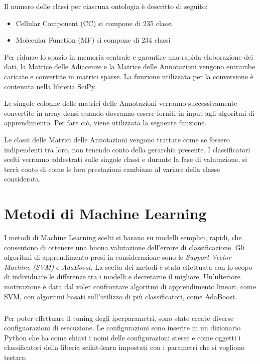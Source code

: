 \documentclass[12pt,a4paper,oneside,hidelinks]{report}
\begin{document}
Il numero delle classi per ciascuna ontologia è descritto di seguito:

\begin{itemize}
    \item Cellular Component (CC) si compone di 235 classi
    \item Molecular Function (MF) si compone di 234 classi
\end{itemize}
  
Per ridurre lo spazio in memoria centrale e garantire una rapida elaborazione dei dati, la Matrice delle Adiacenze e la Matrice delle Annotazioni vengono entrambe caricate e convertite in matrici sparse. La funzione utilizzata per la conversione è contenuta nella libreria SciPy.

Le singole colonne delle matrici delle Annotazioni verranno successivamente convertite in array densi quando dovranno essere forniti in input agli algoritmi di apprendimento. Per fare ciò, viene utilizzata la seguente funzione.

Le classi delle Matrici delle Annotazioni vengono trattate come se fossero indipendenti tra loro, non tenendo conto della gerarchia presente. I classificatori scelti verranno addestrati sulle singole classi e durante la fase di valutazione, si terrà conto di come le loro prestazioni cambiano al variare della classe considerata.

\chapter{Metodi di Machine Learning} 
\label{chap:metodi}

I metodi di Machine Learning scelti si basano su modelli semplici, rapidi, che consentono di ottenere una buona valutazione dell'errore di classificazione. Gli algoritmi di apprendimento presi in considerazione sono le \textit{Support Vector Machine (SVM)} e \textit{AdaBoost}. La scelta dei metodi è stata effettuata con lo scopo di individuare le differenze tra i modelli e decretarne il migliore. Un'ulteriore motivazione è data dal voler confrontare algoritmi di apprendimento lineari, come SVM, con algoritmi basati sull'utilizzo di più classificatori, come AdaBoost.

\paragraph*{}
Per poter effettuare il tuning degli iperparametri, sono state create diverse configuarazioni di esecuzione.
Le configurazioni sono inserite in un dizionario Python che ha come chiavi i nomi delle configurazioni stesse e come oggetti i classificatori della liberia scikit-learn impostati con i parametri che si vogliono testare.
\end{document}
